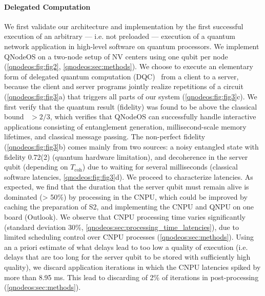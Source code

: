\paragraph{Delegated Computation}
We first validate our architecture and implementation by the first successful execution of an arbitrary --- i.e. not preloaded --- execution of a quantum network application in high-level software on quantum processors.
We implement QNodeOS on a two-node setup of NV centers using one qubit per node (\cref{qnodeos:fig:fig2}, \cref{qnodeos:sec:methods}).
We choose to execute an elementary form of delegated quantum computation (DQC)~\cite{broadbent_2009_ubqc} from a client to a server, because the client and server programs jointly realize repetitions of a circuit (\cref{qnodeos:fig:fig3}a) that triggers all parts of our system (\cref{qnodeos:fig:fig3}c). 
We first verify that the quantum result (fidelity) was found to be above the classical bound~\cite{massar_optimal_1995} $> 2/3$, which verifies that QNodeOS can successfully handle interactive applications consisting of entanglement generation, millisecond-scale memory lifetimes, and classical message passing.
The non-perfect fidelity (\cref{qnodeos:fig:fig3}b) comes mainly from two sources: a noisy entangled state with fidelity 0.72(2) (quantum hardware limitation), and decoherence in the server qubit (depending on $T_{\text{coh}}$) due to waiting for several milliseconds (classical software latencies, \cref{qnodeos:fig:fig3}d).
We proceed to characterize latencies.
As expected, we find that the duration that the server qubit must remain alive is dominated (> 50\%) by processing in the CNPU, which could be improved by caching the preparation of S2, and implementing the CNPU and QNPU on one board (Outlook).
We observe that CNPU processing time varies significantly (standard deviation 30\%, \cref{qnodeos:sec:processing_time_latencies}), due to limited scheduling control over CNPU processes (\cref{qnodeos:sec:methods}).
Using an a priori estimate of what delays lead to too low a quality of execution (i.e. delays that are too long for the server qubit to be stored with sufficiently high quality), we discard application iterations in which the CNPU latencies spiked by more than 8.95 ms.
This lead to discarding of 2\% of iterations in post-processing (\cref{qnodeos:sec:methods}).

